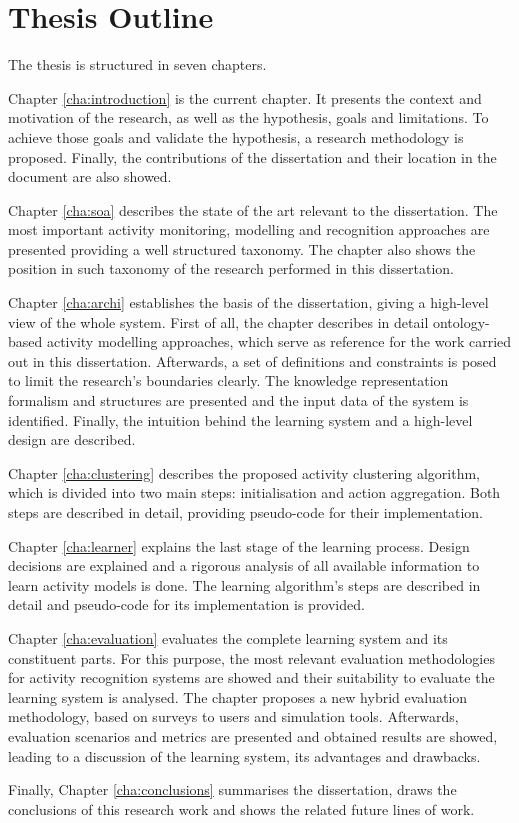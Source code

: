 \section{Thesis Outline}
\label{sec:intro:outline}

The thesis is structured in seven chapters.

Chapter \ref{cha:introduction} is the current chapter. It presents the context and motivation of the research, as well as the hypothesis, goals and limitations. To achieve those goals and validate the hypothesis, a research methodology is proposed. Finally, the contributions of the dissertation and their location in the document are also showed.

Chapter \ref{cha:soa} describes the state of the art relevant to the dissertation. The most important activity monitoring, modelling and recognition approaches are presented providing a well structured taxonomy. The chapter also shows the position in such taxonomy of the research performed in this dissertation.

Chapter \ref{cha:archi} establishes the basis of the dissertation, giving a high-level view of the whole system. First of all, the chapter describes in detail ontology-based activity modelling approaches, which serve as reference for the work carried out in this dissertation. Afterwards, a set of definitions and constraints is posed to limit the research's boundaries clearly. The knowledge representation formalism and structures are presented and the input data of the system is identified. Finally, the intuition behind the learning system and a high-level design are described.

Chapter \ref{cha:clustering} describes the proposed activity clustering algorithm, which is divided into two main steps: initialisation and action aggregation. Both steps are described in detail, providing pseudo-code for their implementation.

Chapter \ref{cha:learner} explains the last stage of the learning process. Design decisions are explained and a rigorous analysis of all available information to learn activity models is done. The learning algorithm's steps are described in detail and pseudo-code for its implementation is provided.

Chapter \ref{cha:evaluation} evaluates the complete learning system and its constituent parts. For this purpose, the most relevant evaluation methodologies for activity recognition systems are showed and their suitability to evaluate the learning system is analysed. The chapter proposes a new hybrid evaluation methodology, based on surveys to users and simulation tools. Afterwards, evaluation scenarios and metrics are presented and obtained results are showed, leading to a discussion of the learning system, its advantages and drawbacks.

Finally, Chapter \ref{cha:conclusions} summarises the dissertation, draws the conclusions of this research work and shows the related future lines of work.